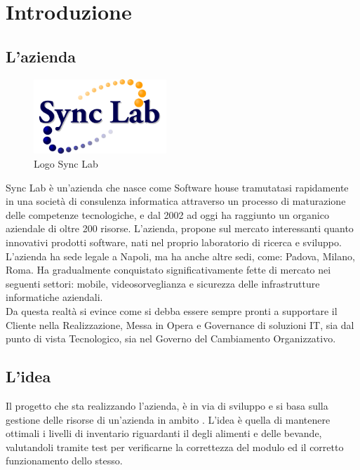 
\chapter{Introduzione}
\section{L'azienda}
\begin{figure}[H]
	\begin{center} \includegraphics[width=5cm]{figures/logo_synclab}
		\caption[Logo Sync Lab]{Logo Sync Lab} 
		\label{logo_python} 
	\end{center}
\end{figure}
Sync Lab è un'azienda che nasce come Software house tramutatasi rapidamente in una società di consulenza informatica attraverso un processo di maturazione delle competenze tecnologiche, e dal 2002 ad oggi ha raggiunto un organico aziendale di oltre 200 risorse.
L'azienda, propone sul mercato interessanti quanto innovativi prodotti software, nati nel proprio laboratorio di ricerca e sviluppo.\\
L'azienda ha sede legale a Napoli, ma ha anche altre sedi, come: Padova, Milano, Roma. 
Ha gradualmente conquistato significativamente fette di mercato nei seguenti settori: mobile, videosorveglianza e sicurezza delle infrastrutture informatiche aziendali.\\
Da questa realtà si evince come si debba essere sempre pronti a supportare il Cliente nella Realizzazione, Messa in Opera e Governance di soluzioni IT, sia dal punto di vista Tecnologico, sia nel Governo del Cambiamento Organizzativo.

\section{L'idea}
Il progetto che sta realizzando l'azienda, è in via di sviluppo e si basa sulla gestione delle risorse di un'azienda in ambito .
L'idea è quella di mantenere ottimali i livelli di inventario riguardanti il  degli alimenti e delle bevande, valutandoli tramite test per verificarne la correttezza del modulo ed il corretto funzionamento dello stesso.

